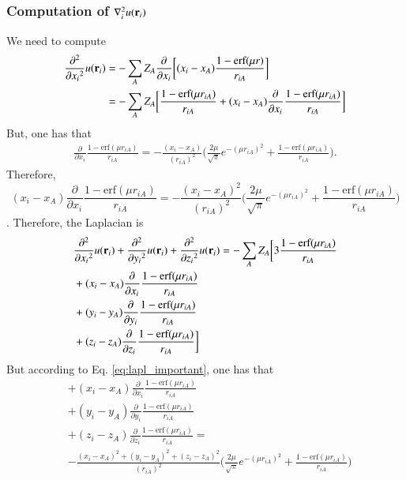 \documentclass[aip,jcp,reprint,noshowkeys,superscriptaddress]{revtex4-1}
\newcommand{\deriv}[3]{\frac{\partial^{#3} #1}{\partial {#2}^{#3}}}
\newcommand{\br}[0]{{\bf {r}}}
\begin{document}
\subsubsection{Computation of $\nabla^2_i u(\br{}_i) $}
We need to compute 
\begin{equation}
 \begin{aligned}
 \deriv{}{x_{i}}{2} u(\br{}_i) & = -\sum_A Z_A \deriv{}{x_i}{} \bigg[(x_i - x_A) \frac{1 - \text{erf}(\mu r)}{r_{iA}} \bigg] \\
                               & = -\sum_A Z_A \bigg[ \frac{1 - \text{erf}(\mu r_{iA})}{r_{iA}} + (x_i - x_A) \deriv{}{x_i}{}\frac{1 - \text{erf}(\mu r_{iA})}{r_{iA}}  \bigg]
 \end{aligned}
\end{equation}
But, one has that
\begin{equation}
 \begin{aligned}
 \deriv{}{x_i}{} \frac{1 - \text{erf}(\mu r_{iA})}{r_{iA}} = - \frac{(x_i - x_A)}{(r_{iA})^2} \bigg( \frac{2 \mu}{\sqrt{\pi}} e^{-(\mu r_{iA})^2} + \frac{1 - \text{erf}(\mu r_{iA})}{r_{iA}}\bigg).
 \end{aligned}
\end{equation}
Therefore, 
\begin{equation}
 \label{eq:lapl_important}
 (x_i - x_A) \deriv{}{x_i}{}\frac{1 - \text{erf}(\mu r_{iA})}{r_{iA}} = - \frac{(x_i - x_A)^2}{(r_{iA})^2} \bigg( \frac{2 \mu}{\sqrt{\pi}} e^{-(\mu r_{iA})^2} + \frac{1 - \text{erf}(\mu r_{iA})}{r_{iA}}\bigg)
\end{equation}.
Therefore, the Laplacian is 
\begin{equation}
 \begin{aligned}
 \label{eq:lapl_interm_1}
&  \deriv{}{x_{i}}{2} u(\br{}_i) + \deriv{}{y_{i}}{2} u(\br{}_i) + \deriv{}{z_{i}}{2} u(\br{}_i) =  - \sum_{A} Z_A \bigg[ 3 \frac{1 - \text{erf}(\mu r_{iA})}{r_{iA}}  \\
 & + (x_i - x_A) \deriv{}{x_i}{}\frac{1 - \text{erf}(\mu r_{iA})}{r_{iA}} \\ 
 & + (y_i - y_A) \deriv{}{y_i}{}\frac{1 - \text{erf}(\mu r_{iA})}{r_{iA}} \\ 
 & + (z_i - z_A) \deriv{}{z_i}{}\frac{1 - \text{erf}(\mu r_{iA})}{r_{iA}}  \bigg]
 \end{aligned}
\end{equation}
But according to Eq. \eqref{eq:lapl_important}, one has that 
\begin{equation}
 \begin{aligned}
 & + (x_i - x_A) \deriv{}{x_i}{}\frac{1 - \text{erf}(\mu r_{iA})}{r_{iA}} \\ 
 & + (y_i - y_A) \deriv{}{y_i}{}\frac{1 - \text{erf}(\mu r_{iA})}{r_{iA}} \\ 
 & + (z_i - z_A) \deriv{}{z_i}{}\frac{1 - \text{erf}(\mu r_{iA})}{r_{iA}}  = \\
 &- \frac{(x_i - x_A)^2 + (y_i - y_A)^2 + (z_i - z_A)^2}{(r_{iA})^2} \bigg( \frac{2 \mu}{\sqrt{\pi}} e^{-(\mu r_{iA})^2} + \frac{1 - \text{erf}(\mu r_{iA})}{r_{iA}}\bigg)
 \end{aligned}
\end{equation}
\end{document}
